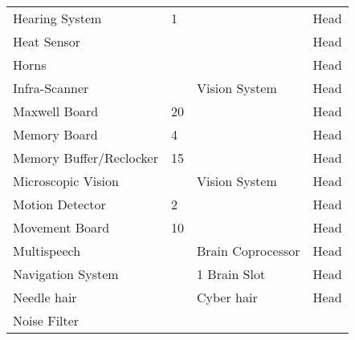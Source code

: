 \documentclass[twoside]{book}
\begin{document}
\begin{longtable}{p{1.25in}p{2em}ll}
  \raggedright
           Hearing System 
  &
   1 
  &
  
  &
   Head 
  \tabularnewline
      
  \raggedright
           Heat Sensor 
  &
  
  &
  
  &
   Head 
  \tabularnewline
      
  \raggedright
           Horns 
  &
  
  &
  
  &
   Head 
  \tabularnewline
      
  \raggedright
           Infra-Scanner 
  &
  
  &
   Vision System 
  &
   Head 
  \tabularnewline
      
  \raggedright
           Maxwell Board 
  &
   20 
  &
  
  &
   Head 
  \tabularnewline
      
  \raggedright
           Memory Board 
  &
   4 
  &
  
  &
   Head 
  \tabularnewline
      
  \raggedright
           Memory Buffer/Reclocker
           
  &
   15 
  &
  
  &
   Head 
  \tabularnewline
      
  \raggedright
           Microscopic Vision 
  &
  
  &
   Vision System 
  &
   Head 
  \tabularnewline
      
  \raggedright
           Motion Detector 
  &
   2 
  &
  
  &
   Head 
  \tabularnewline
      
  \raggedright
           Movement Board 
  &
   10 
  &
  
  &
   Head 
  \tabularnewline
      
  \raggedright
           Multispeech 
  &
  
  &
   Brain Coprocessor
           
  &
   Head 
  \tabularnewline
      
  \raggedright
           Navigation System 
  &
  
  &
   1 Brain Slot 
  &
   Head 
  \tabularnewline
      
  \raggedright
           Needle hair 
  &
  
  &
   Cyber hair 
  &
   Head 
  \tabularnewline
      
  \raggedright
           Noise Filter 
  &
  

\end{longtable}
\end{document}
